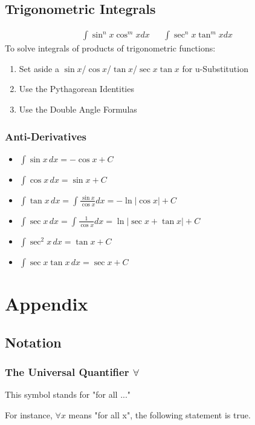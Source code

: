 \documentclass{article}
\begin{document}
\subsection{Trigonometric Integrals}
\begin{align*}
    \int \sin^n{x}\cos^m{x}dx && \int \sec^n{x}\tan^m{x}dx
\end{align*}
To solve integrals of products of trigonometric functions:
\begin{enumerate}
    \item Set aside a $\sin{x}$/$\cos{x}$/$\tan{x}$/$\sec{x}\tan{x}$ for u-Substitution
    \item Use the Pythagorean Identities
    \item Use the Double Angle Formulas
\end{enumerate}



\subsubsection{Anti-Derivatives}
\begin{itemize}
    \item $\int\sin{x}\,dx=-\cos{x}+C$
    \item $\int\cos{x}\,dx=\sin{x}+C$
    \item $\int\tan{x}\,dx=\int\frac{\sin{x}}{\cos{x}}dx=-\ln{|\cos{x}|}+C$
    \item $\int\sec{x}\,dx=\int\frac{1}{\cos{x}}dx=\ln{|\sec{x}+\tan{x}|}+C$
    \item $\int\sec^2{x}\,dx=\tan{x}+C$
    \item $\int\sec{x}\tan{x}\,dx=\sec{x}+C$
\end{itemize}

\section{Appendix}
\subsection{Notation}
\subsubsection{\texorpdfstring{The Universal Quantifier $\forall$}{The Universal Quantifier}}
This symbol stands for "for all ..."

For instance, $\forall x$ means "for all x", the following statement is true.
\end{document}
